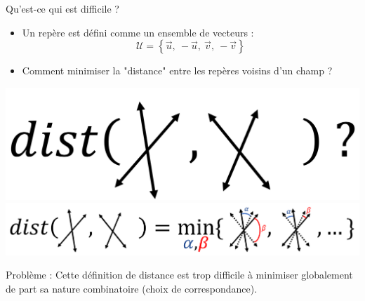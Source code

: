 \begin{frame}{Qu'est-ce qui est difficile ?}
    \centering
    \small
    \begin{itemize}
     \item Un repère est défini comme un ensemble de vecteurs : $$\mathcal{U} = \left\{\vec{u},\ -\vec{u},\ \vec{v},\ -\vec{v}\right\}$$ 
     \item Comment minimiser la "distance" entre les repères voisins d'un champ ?
     
   \end{itemize}
      \vspace*{0.5\baselineskip}
      
    \begin{overprint}
     \centering
    \includegraphics[width=0.6\linewidth]{img_spm_ff/dist_question.PNG}
            \centering
      \includegraphics[width=\linewidth]{img_spm_ff/dist_sol.PNG}
        
        Problème : Cette définition de distance est trop difficile à minimiser globalement de part sa nature combinatoire (choix de correspondance).
    
    \end{overprint}
    \normalsize
\end{frame}


